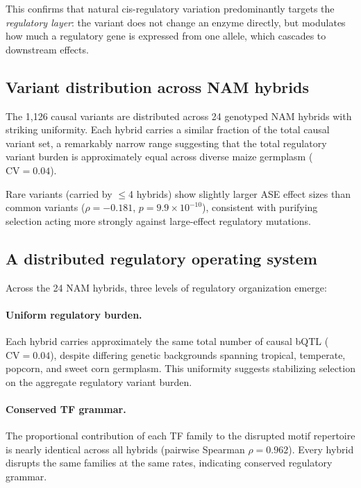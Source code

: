\documentclass[11pt,a4paper]{article}
\begin{document}
This confirms that natural cis-regulatory variation predominantly targets the
\emph{regulatory layer}: the variant does not change an enzyme directly, but
modulates how much a regulatory gene is expressed from one allele, which
cascades to downstream effects.


\subsection{Variant distribution across NAM hybrids}

The 1,126 causal variants are distributed across 24 genotyped NAM hybrids
with striking uniformity. Each hybrid carries a similar fraction of the total
causal variant set, a remarkably narrow range suggesting that the total
regulatory variant burden is approximately equal across diverse maize
germplasm ($\text{CV} = 0.04$).

Rare variants (carried by $\leq$4 hybrids) show slightly larger ASE effect
sizes than common variants ($\rho = -0.181$, $p = 9.9 \times 10^{-10}$),
consistent with purifying selection acting more strongly against large-effect
regulatory mutations.


\subsection{A distributed regulatory operating system}
\label{sec:distributed}

Across the 24 NAM hybrids, three levels of regulatory organization emerge:

\paragraph{Uniform regulatory burden.}
Each hybrid carries approximately the same total number of causal bQTL
($\text{CV} = 0.04$), despite differing genetic backgrounds spanning tropical,
temperate, popcorn, and sweet corn germplasm. This uniformity suggests
stabilizing selection on the aggregate regulatory variant burden.

\paragraph{Conserved TF grammar.}
The proportional contribution of each TF family to the disrupted motif
repertoire is nearly identical across all hybrids (pairwise Spearman
$\rho = 0.962$). Every hybrid disrupts the same families at the same rates,
indicating conserved regulatory grammar.
\end{document}
